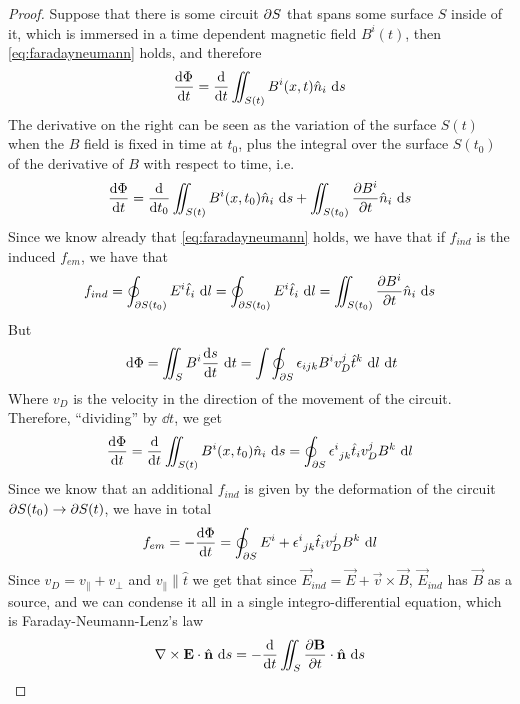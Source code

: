 \documentclass[../electromagnetism]{subfiles}
\begin{document}
\begin{proof}
    Suppose that there is some circuit $\partial S$ that spans some surface $S$ inside of it, which is immersed in a time dependent magnetic field $B^i(t)$, then \eqref{eq:faradayneumann} holds, and therefore
    \begin{equation*}
	\dv{\Phi}{t}=\dv{t}\iint_{S(t)}B^i(x,t)\hat{n}_i\ \mathrm{d} s
    \end{equation*}
    The derivative on the right can be seen as the variation of the surface $S(t)$ when the $B$ field is fixed in time at $t_0$, plus the integral over the surface $S(t_0)$ of the derivative of $B$ with respect to time, i.e.
    \begin{equation*}
	\dv{\Phi}{t}=\dv{t_0}\iint_{S(t)}B^i(x,t_0)\hat{n}_i\ \mathrm{d} s+\iint_{S(t_0)}\pdv{B^i}{t}\hat{n}_i\ \mathrm{d} s
    \end{equation*}
    Since we know already that \eqref{eq:faradayneumann} holds, we have that if $f_{ind}$ is the induced $f_{em}$, we have that
    \begin{equation*}
	f_{ind}=\oint_{\partial S(t_0)}E^i\hat{t}_i\ \mathrm{d} l=\oint_{\partial S(t_0)}E^i\hat{t}_i\ \mathrm{d} l=\iint_{S(t_0)}\pdv{B^i}{t}\hat{n}_i\ \mathrm{d} s
    \end{equation*}
    But
    \begin{equation}
        \ \mathrm{d}\Phi=\iint_SB^i\dv{s}{t}\ \mathrm{d} t=\int\oint_{\partial S}\epsilon_{ijk}B^iv^j_{D}\hat{t}^k\ \mathrm{d} l\ \mathrm{d} t
    \end{equation}
    Where $v_D$ is the velocity in the direction of the movement of the circuit. Therefore, ``dividing'' by $\dd t$, we get
    \begin{equation*}
	\dv{\Phi}{t}=\dv{t}\iint_{S(t)}B^i(x,t_0)\hat{n}_i\ \mathrm{d} s=\oint_{\partial S}\epsilon^{i}_{\ jk}\hat{t}_iv^j_DB^k\ \mathrm{d} l
    \end{equation*}
    Since we know that an additional $f_{ind}$ is given by the deformation of the circuit $\partial S(t_0)\to\partial S(t)$, we have in total
    \begin{equation*}
	f_{em}=-\dv{\Phi}{t}=\oint_{\partial S}E^i+\epsilon^{i}_{\ jk}\hat{t}_iv^j_DB^k\ \mathrm{d} l
    \end{equation*}
    Since $v_D=v_\parallel+v_\perp$ and $v_\parallel\parallel\hat{t}$ we get that since $\vec{E}_{ind}=\vec{E}+\vec{v}\times\vec{B}$, $\vec{E}_{ind}$ has $\vec{B}$ as a source, and we can condense it all in a single integro-differential equation, which is Faraday-Neumann-Lenz's law
    \begin{equation*}
	\nabla\times\mathbf{E}\cdot\hat{\mathbf{n}}\ \mathrm{d} s=-\dv{t}\iint_S\pdv{\mathbf{B}}{t}\cdot\hat{\mathbf{n}}\ \mathrm{d} s
    \end{equation*}
\end{proof}
\end{document}
